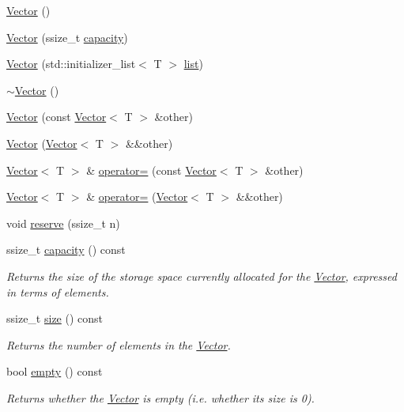 \begin{DoxyCompactItemize}
\item 
\hyperlink{classVector_a39d6069675db4ecfc1ab81d440da759a}{Vector} ()
\item 
\hyperlink{classVector_a2967c34f4076209cb0663428ffd7c54d}{Vector} (ssize\+\_\+t \hyperlink{classVector_a83893154a5d9c5cf0f4f12146371212b}{capacity})
\item 
\hyperlink{classVector_a0dba46f864a228e2abde110db8a4e4d8}{Vector} (std\+::initializer\+\_\+list$<$ T $>$ \hyperlink{protocollist-p}{list})
\item 
\hyperlink{classVector_afd524fac19e6d3d69db5198ffe2952b0}{$\sim$\+Vector} ()
\item 
\hyperlink{classVector_ad0ed347210040680329535d7e4d16ae1}{Vector} (const \hyperlink{classVector}{Vector}$<$ T $>$ \&other)
\item 
\hyperlink{classVector_a2694f1fd3e904f3d7b9d387cafa1dafe}{Vector} (\hyperlink{classVector}{Vector}$<$ T $>$ \&\&other)
\item 
\hyperlink{classVector}{Vector}$<$ T $>$ \& \hyperlink{classVector_a9b191182bc58811b1f40a62626d3168d}{operator=} (const \hyperlink{classVector}{Vector}$<$ T $>$ \&other)
\item 
\hyperlink{classVector}{Vector}$<$ T $>$ \& \hyperlink{classVector_ac4cedd399454463a0e9bdf6defd09a04}{operator=} (\hyperlink{classVector}{Vector}$<$ T $>$ \&\&other)
\item 
void \hyperlink{classVector_aebff8698d4672ac51e87d719a15a4a77}{reserve} (ssize\+\_\+t n)
\item 
ssize\+\_\+t \hyperlink{classVector_a83893154a5d9c5cf0f4f12146371212b}{capacity} () const
\begin{DoxyCompactList}\small\item\em Returns the size of the storage space currently allocated for the \hyperlink{classVector}{Vector}, expressed in terms of elements. \end{DoxyCompactList}\item 
ssize\+\_\+t \hyperlink{classVector_a0fee6dcc9febf5495fac43009213bdc8}{size} () const
\begin{DoxyCompactList}\small\item\em Returns the number of elements in the \hyperlink{classVector}{Vector}. \end{DoxyCompactList}\item 
bool \hyperlink{classVector_ad688a8a0dfbd07ea63d838058a436f79}{empty} () const
\begin{DoxyCompactList}\small\item\em Returns whether the \hyperlink{classVector}{Vector} is empty (i.\+e. whether its size is 0). \end{DoxyCompactList}\item 

\end{DoxyCompactItemize}
